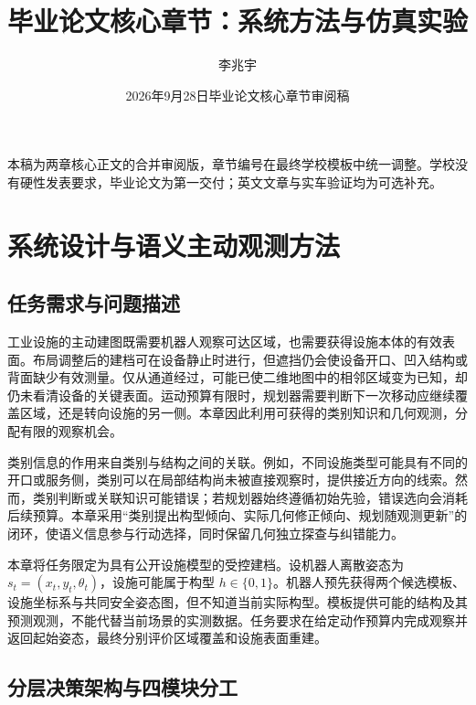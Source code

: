 \documentclass[11pt,a4paper]{article}
\title{\textbf{毕业论文核心章节：系统方法与仿真实验}}
\author{李兆宇}
\date{2026年9月28日\quad 毕业论文核心章节审阅稿}
\begin{document}
\maketitle
本稿为两章核心正文的合并审阅版，章节编号在最终学校模板中统一调整。学校没有硬性发表要求，毕业论文为第一交付；英文文章与实车验证均为可选补充。

\hypertarget{ux7cfbux7edfux8bbeux8ba1ux4e0eux8bedux4e49ux4e3bux52a8ux89c2ux6d4bux65b9ux6cd5}{%
\section{系统设计与语义主动观测方法}\label{ux7cfbux7edfux8bbeux8ba1ux4e0eux8bedux4e49ux4e3bux52a8ux89c2ux6d4bux65b9ux6cd5}}

\hypertarget{ux4efbux52a1ux9700ux6c42ux4e0eux95eeux9898ux63cfux8ff0}{%
\subsection{任务需求与问题描述}\label{ux4efbux52a1ux9700ux6c42ux4e0eux95eeux9898ux63cfux8ff0}}

工业设施的主动建图既需要机器人观察可达区域，也需要获得设施本体的有效表面。布局调整后的建档可在设备静止时进行，但遮挡仍会使设备开口、凹入结构或背面缺少有效测量。仅从通道经过，可能已使二维地图中的相邻区域变为已知，却仍未看清设备的关键表面。运动预算有限时，规划器需要判断下一次移动应继续覆盖区域，还是转向设施的另一侧。本章因此利用可获得的类别知识和几何观测，分配有限的观察机会。

类别信息的作用来自类别与结构之间的关联。例如，不同设施类型可能具有不同的开口或服务侧，类别可以在局部结构尚未被直接观察时，提供接近方向的线索。然而，类别判断或关联知识可能错误；若规划器始终遵循初始先验，错误选向会消耗后续预算。本章采用``类别提出构型倾向、实际几何修正倾向、规划随观测更新''的闭环，使语义信息参与行动选择，同时保留几何独立探查与纠错能力。

本章将任务限定为具有公开设施模型的受控建档。设机器人离散姿态为 \(s_t=(x_t,y_t,\theta_t)\)，设施可能属于构型 \(h\in\{0,1\}\)。机器人预先获得两个候选模板、设施坐标系与共同安全姿态图，但不知道当前实际构型。模板提供可能的结构及其预测观测，不能代替当前场景的实测数据。任务要求在给定动作预算内完成观察并返回起始姿态，最终分别评价区域覆盖和设施表面重建。

\hypertarget{ux5206ux5c42ux51b3ux7b56ux67b6ux6784ux4e0eux56dbux6a21ux5757ux5206ux5de5}{%
\subsection{分层决策架构与四模块分工}\label{ux5206ux5c42ux51b3ux7b56ux67b6ux6784ux4e0eux56dbux6a21ux5757ux5206ux5de5}}
\end{document}
